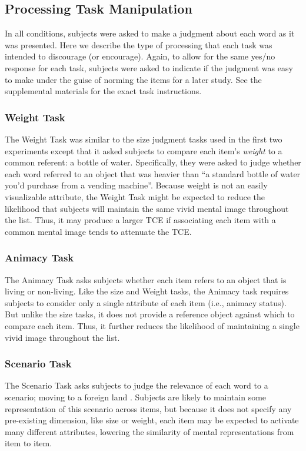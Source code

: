 \documentclass[jou,natbib]{apa6} %
\begin{document}
\subsection{Processing Task Manipulation}
In all conditions, subjects were asked to make a judgment about each word as it was presented. Here we describe the type of processing that each task was intended to discourage (or encourage). Again, to allow for the same yes/no response for each task, subjects were asked to indicate if the judgment was easy to make under the guise of norming the items for a later study. See the supplemental materials for the exact task instructions.

\subsubsection{Weight Task} The Weight Task was similar to the size judgment tasks used in the first two experiments except that it asked subjects to compare each item's \emph{weight} to a common referent: a bottle of water. Specifically, they were asked to judge whether each word referred to an object that was heavier than ``a standard bottle of water you'd purchase from a vending machine''. Because weight is not an easily visualizable attribute, the Weight Task might be expected to reduce the likelihood that subjects will maintain the same vivid mental image throughout the list. Thus, it may produce a larger TCE if associating each item with a common mental image tends to attenuate the TCE.

\subsubsection{Animacy Task} The Animacy Task asks subjects whether each item refers to an object that is living or non-living. Like the size and Weight tasks, the Animacy task requires subjects to consider only a single attribute of each item (i.e., animacy status). But unlike the size tasks, it does not provide a reference object against which to compare each item. Thus, it further reduces the likelihood of maintaining a single vivid image throughout the list. 

\subsubsection{Scenario Task} The Scenario Task asks subjects to judge the relevance of each word to a scenario; moving to a foreign land \citep{NairEtal17}. Subjects are likely to maintain some representation of this scenario across items, but because it does not specify any pre-existing dimension, like size or weight, each item may be expected to activate many different attributes, lowering the similarity of mental representations from item to item.
\end{document}
